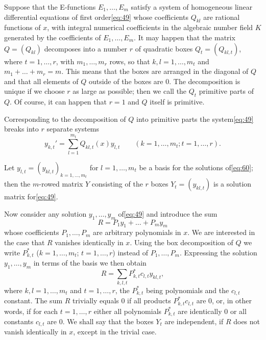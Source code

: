 Suppose that the E-functions $E_1, \dots, E_m$ satisfy a system of homogeneous linear differential equations of first order\eqref{eq:49} whose coefficients $Q_{kl}$ are rational functions of $x$, with integral numerical coefficients in the algebraic number field $K$ generated by the coefficients of $E_1, \dots, E_m$. It may happen that the matrix $Q=(Q_{kl})$ decomposes into a number $r$ of quadratic boxes $Q_t=(Q_{kl,t})$, where $t=1,\dots,r$, with $m_1,\dots,m_r$ rows, so that $k,l=1,\dots,m_t$ and $m_1+\dots+m_r=m$. This means that the boxes are arranged in the diagonal of $Q$ and that all elements of $Q$ outside of the boxes are 0. The decomposition is unique if we choose $r$ as large as possible; then we call the $Q_t$ primitive parts of $Q$. Of course, it can happen that $r=1$ and $Q$ itself is primitive.

Corresponding to the decomposition of $Q$ into primitive parts the system\eqref{eq:49} breaks into $r$ separate systems
\begin{equation}
y_{k,t}' = \sum_{l=1}^{m_t} Q_{kl,t}(x)y_{l,t} \qquad (k=1,\dots,m_t; t=1,\dots,r). \tag{60}\label{eq:60}
\end{equation}

Let $y_{l,t} = (y_{kl,t})_{k=1,\dots,m_t}$ for $l=1,\dots,m_t$ be a basis for the solutions of\eqref{eq:60}; then the $m$-rowed matrix $Y$ consisting of the $r$ boxes $Y_t=(y_{kl,t})$ is a solution matrix for\eqref{eq:49}.

Now consider any solution $y_1, \dots, y_m$ of\eqref{eq:49} and introduce the sum
\begin{equation}
R = P_1 y_1 + \dots + P_m y_m \tag{61}\label{eq:61}
\end{equation}
whose coefficients $P_1, \dots, P_m$ are arbitrary polynomials in $x$. We are interested in the case that $R$ vanishes identically in $x$. Using the box decomposition of $Q$ we write $P_{k,t}^*$ ($k=1,\dots,m_t$; $t=1,\dots,r$) instead of $P_1, \dots, P_m$. Expressing the solution $y_1, \dots, y_m$ in terms of the basis we then obtain
\begin{equation}
R = \sum_{k,l,t} P_{k,t}^* c_{l,t} y_{kl,t}, \tag{62}\label{eq:62}
\end{equation}
where $k,l=1,\dots,m_t$ and $t=1,\dots,r$, the $P_{k,t}^*$ being polynomials and the $c_{l,t}$ constant. The sum $R$ trivially equals 0 if all products $P_{k,t}^* c_{l,t}$ are 0, or, in other words, if for each $t=1,\dots,r$ either all polynomials $P_{k,t}^*$ are identically 0 or all constants $c_{l,t}$ are 0. We shall say that the boxes $Y_t$ are independent, if $R$ does not vanish identically in $x$, except in the trivial case.

